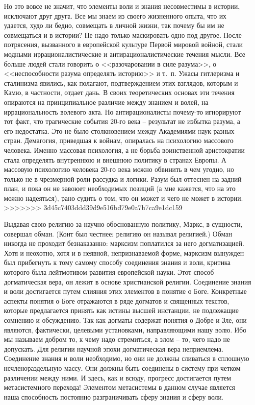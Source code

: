 \documentclass{book}
\begin{document}
Но это вовсе не значит, что элементы воли и знания несовместимы в истории, исключают друг друга. Все мы знаем из своего жизненного опыта, что их удается, худо ли бедно, сов­мещать в личной жизни, так почему бы им не совмещаться и в истории? Не надо только маскировать одно под другое. После потрясения, вызванного в европейской культуре Первой мировой войной, стали модными иррационалистические и антирационалистические течения мысли. Все больше людей стали говорить о <<разочаровании в силе разума>>, о <<неспособности разума определять историю>> и т.~п. Ужасы гитлеризма и сталинизма явились, как полагают, подтверждением этих взглядов, которым и Камю, в частности, отдает дань. В своих теоретических основах эти течения опираются на принципиальное различие между знанием и волей, на иррациональность волевого акта. Но антирационалисты почему-то игнорируют тот факт, что тра­гические события 20-го века -- результат не избытка разума, а его недостатка. Это не было столкновением между Академиями наук разных стран. Демагогия, 
приведшая к войнам, опиралась на психологию массового человека.  Именно массовая психология, а не борьба воинственной аристократии стала определять внутреннюю и внешнюю политику в странах Европы. А массовую психологию человека 20-го века можно обвинить в чем угодно, но только не в чрезмерной роли рассудка и логики. Разум был оттеснен на задний план, и пока он не завоюет необходимых позиций (а мне кажется, что на это можно надеяться), рано судить о том, что он может и чего не может в истории.
>>>>>>> 3d45c7403ddd39d9e516bd79e0a7b7ca9e1dc159

Выдавая свою религию за научно обоснованную политику, Маркс, в сущности, совершал обман. (Конт был честнее: религию он называл религией.) Обман никогда не проходит безнаказанно: марксизм поплатился за него догматизацией. Хотя и неохотно, хотя и в неявной, непризнаваемой форме, марксизм вынужден был прибегнуть к тому самому способу соединения знания и воли, критика которого была лейтмотивом развития европейской науки. Этот способ -- догматическая вера, он лежит в основе христианской религии. Соединение знания и воли достигается путем слияния этих элементов в понятие о Боге. Конкретные аспекты понятия о Боге отражаются в ряде догматов и священных текстов, которые предлагается принять как истины высшей инстанции, не подлежащие сомнению и обсуждению. Так как догматы содержат понятия о Добре и Зле, они являются, фактически, целевыми установками, направляющими нашу волю. Ибо мы называем добром то, к чему надо стре­миться, а злом -- то, чего надо не допускать.
Для религии научной эпохи догматическая вера неприемлема. Соединение знания и воли необходимо, но они не должны сливаться в сплошную нечленораздельную массу. Они должны быть соединены в систему при четком различении между ними. И здесь, как и всюду, прогресс достигается путем метасистемного перехода! Элементом метасистемы в данном случае является наша способность постоянно разграничивать сферу знания и сферу воли.
\end{document}
